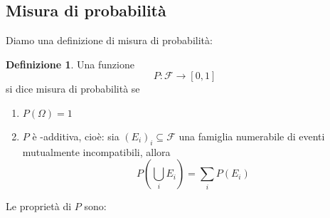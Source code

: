 \documentclass{article}
\theoremstyle{plain}
\theoremstyle{definition}
\newtheorem{definizione}{Definizione}[section]
\theoremstyle{remark}
\begin{document}
\subsection{Misura di probabilità} %
\label{sub:misura_di_probabilità}
Diamo una definizione di misura di probabilità:
\begin{definizione}
	Una funzione
	\begin{equation*}
		P\colon\mathcal{F}\to[0,1]
	\end{equation*}
	si dice misura di probabilità se
	\begin{enumerate}
		\item $P(\Omega)=1$
		\item $P$ è \sigma-additiva, cioè: sia $(E_i)_i\subseteq\mathcal{F}$ una famiglia numerabile di eventi mutualmente incompatibili, allora
		\begin{equation*}
			P(\bigcup_i E_i)=\sum_i P(E_i)
		\end{equation*}
	\end{enumerate}
\end{definizione}
Le proprietà di $P$ sono:
\end{document}
